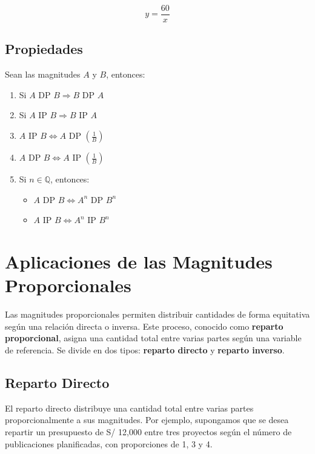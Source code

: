 \documentclass[
  stu,
  floatsintext,
  longtable,
  a4paper,
  nolmodern,
  notxfonts,
  notimes,
  12pt,
  colorlinks=true,linkcolor=blue,citecolor=blue,urlcolor=blue]{apa7}
\providecommand{\tightlist}{%
  \setlength{\itemsep}{0pt}\setlength{\parskip}{0pt}}
\begin{document}
\[
y = \frac{60}{x}
\]

\subsection{Propiedades}\label{propiedades}

Sean las magnitudes \(A\) y \(B\), entonces:

\begin{enumerate}
\def\labelenumi{\arabic{enumi}.}
\tightlist
\item
  Si \(A \text{ DP } B \Rightarrow B \text{ DP } A\)
\item
  Si \(A \text{ IP } B \Rightarrow B \text{ IP } A\)
\item
  \(A \text{ IP } B \Leftrightarrow A \text{ DP } \left( \frac{1}{B} \right)\)
\item
  \(A \text{ DP } B \Leftrightarrow A \text{ IP } \left( \frac{1}{B} \right)\)
\item
  Si \(n \in \mathbb{Q}\), entonces:

  \begin{itemize}
  \tightlist
  \item
    \(A \text{ DP } B \Leftrightarrow A^n \text{ DP } B^n\)
  \item
    \(A \text{ IP } B \Leftrightarrow A^n \text{ IP } B^n\)
  \end{itemize}
\end{enumerate}

\section{Aplicaciones de las Magnitudes
Proporcionales}\label{aplicaciones-de-las-magnitudes-proporcionales}

Las magnitudes proporcionales permiten distribuir cantidades de forma
equitativa según una relación directa o inversa. Este proceso, conocido
como \textbf{reparto proporcional}, asigna una cantidad total entre
varias partes según una variable de referencia. Se divide en dos tipos:
\textbf{reparto directo} y \textbf{reparto inverso}.

\subsection{Reparto Directo}\label{reparto-directo}

El reparto directo distribuye una cantidad total entre varias partes
proporcionalmente a sus magnitudes. Por ejemplo, supongamos que se desea
repartir un presupuesto de S/ 12,000 entre tres proyectos según el
número de publicaciones planificadas, con proporciones de 1, 3 y 4.
\end{document}
